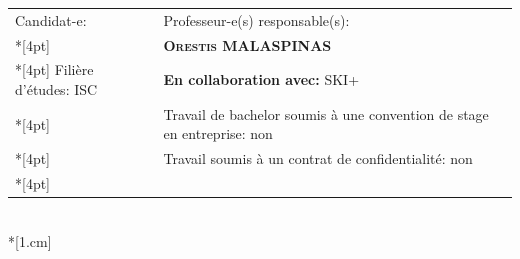 \begin{spacing}{0.91}
\vfill
\begin{center}

\vfill

{
	\begin{tabular*}{16cm}{p{7.59cm} p{7.58cm}}
		\small Candidat-e:					&	\small Professeur-e(s) responsable(s):\\*[4pt]
		\small\textbf{\textsc{\Author}}		&	\small\textbf{\textsc{Orestis MALASPINAS}}\\*[4pt]
		\footnotesize  Filière d'études: ISC	&	\footnotesize  \textbf{En collaboration avec:} SKI+\\*[4pt]
		\footnotesize  {} & \footnotesize  Travail de bachelor soumis à une convention de stage en entreprise: non \\*[4pt]
		\footnotesize  {} & \footnotesize  Travail soumis à un contrat de confidentialité: non\\*[4pt]
	\end{tabular*}\\*[1.cm]
}
	
\end{center}
\end{spacing}
